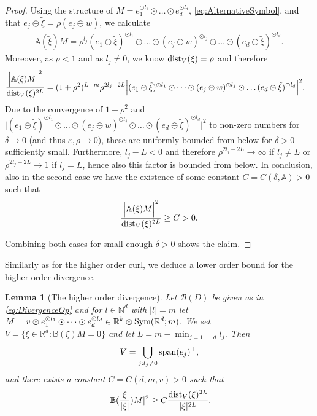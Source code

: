 \documentclass[a4paper, 10pt, twoside, notitlepage]{amsart}
\theoremstyle{plain}
\newtheorem{lem}[prop]{Lemma}
\newcommand{\R}{\mathbb{R}}
\newcommand{\N}{\mathbb{N}}
\renewcommand{\AA}{\mathbb{A}}
\renewcommand{\S}[1]{\textup{Sym}(\R^d;#1)}
\begin{document}
\begin{proof}
					Using the structure of $M = e_1^{\odot l_1} \odot \dots \odot e_d^{\odot l_d}$, \eqref{eq:AlternativeSymbol}, and that $e_j \circleddash \tilde{\xi} = \rho (e_j \circleddash w)$, we calculate
					\begin{align*}
						\AA(\tilde{\xi})M = \rho^{l_j} (e_1 \circleddash \tilde{\xi})^{\odot l_1} \odot \dots \odot (e_j \circleddash w)^{\odot l_j} \odot \dots \odot (e_d \circleddash \tilde{\xi})^{\odot l_d}.
					\end{align*}
					Moreover, as $\rho < 1$ and as $l_j \neq 0$, we know $\operatorname{dist}_V(\xi) = \rho$ and therefore
					\begin{align} \label{eq:OptimalL_A}
						\frac{\Big|\AA(\xi)M\Big|^2}{\dist_V(\xi)^{2L}} & = (1+\rho^2)^{L-m} \rho^{2l_j - 2L} \Big| (e_1 \circleddash \tilde{\xi})^{\odot l_1} \odot \dots \odot (e_j \circleddash w)^{\odot l_j} \odot \dots (e_d \circleddash \tilde{\xi})^{\odot l_d} \Big|^2.
					\end{align}
					Due to the convergence of $1+\rho^2$ and
					$\Big| (e_1 \circleddash \tilde{\xi})^{\odot l_1} \odot \dots \odot (e_j \circleddash w)^{\odot l_j} \odot \dots \odot (e_d \circleddash \tilde{\xi})^{\odot l_d} \Big|^2$ to non-zero numbers
					for $\delta \to 0$ (and thus $\varepsilon, \rho \to 0$), these are uniformly bounded from below for $\delta > 0$ sufficiently small.  Furthermore, $l_j - L < 0$ and therefore
					$\rho^{2l_j - 2L} \to \infty$ if $l_j \neq L$ or $\rho^{2l_j - 2L} \to 1$ if $l_j = L$, hence also this factor is bounded from below.  In conclusion, also in the second case
					we have the existence of some constant $C = C(\delta,\AA) > 0$ such that
					\begin{align*}
						\frac{\Big|\AA(\xi)M \Big|^2}{\dist_V(\xi)^{2L}} \geq C > 0.
					\end{align*}
					
				Combining both cases for small enough $\delta>0$ shows the claim.  
\end{proof}			
			
		
		
		Similarly as for the higher order curl, we deduce a lower order bound for the higher order divergence.
		
		\begin{lem}[The higher order divergence]
			\label{lem:LowerBoundMultipl_div}
			Let $\mathcal{B}(D)$ be given as in \eqref{eq:DivergenceOp} and for $l \in \N^d$ with $|l| = m$ let $M = v \otimes e_1^{\odot l_1} \odot \dots \odot e_d^{\odot l_d} \in \R^k \otimes \S{m}$.  We set
				$V = \{\xi \in \R^d: \mathbb{B}(\xi)M = 0\}$ and let $L = m - \min_{j=1,\dots,d} l_j$.  Then
\begin{align*}
V = \bigcup_{j: l_j \neq 0} \operatorname{span}(e_j)^\perp,
\end{align*}				
			and	 there exists a constant $C=C(d,m,v)>0$ such
			that
			\begin{align*}
                          |\mathbb{B}(\frac{\xi}{|\xi|})M|^2 \geq C \frac{\operatorname{dist}_V(\xi)^{2L}}{|\xi|^{2L}}.
			\end{align*}
		\end{lem}
		
\end{document}

